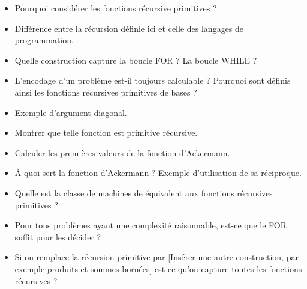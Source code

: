 \documentclass{agregfiche}
\begin{document}
\begin{itemize}
	\item Pourquoi considérer les fonctions récursive primitives ? %
	\item Différence entre la récursion définie ici et celle des langages de programmation.
        \item Quelle construction capture la boucle FOR ? La boucle WHILE
          ?
	\item L'encodage d'un problème est-il toujours calculable ?
          Pourquoi sont définis ainsi les fonctions récursives primitives
          de bases ?
	\item Exemple d'argument diagonal.
	\item Montrer que telle fonction est primitive récursive.
        \item Calculer les premières valeurs de la fonction d'Ackermann.
        \item À quoi sert la fonction d'Ackermann ? Exemple d'utilisation de sa réciproque.
        \item Quelle est la classe de machines de  équivalent aux fonctions récursives primitives ? %
        \item Pour tous problèmes ayant une complexité raisonnable,
          est-ce que le FOR suffit pour les décider ?
        \item Si on remplace la récursion primitive par [Insérer une autre construction, par exemple produits et sommes bornées] est-ce qu'on capture toutes les fonctions récursives ?
\end{itemize}

\secreferences
\end{document}
